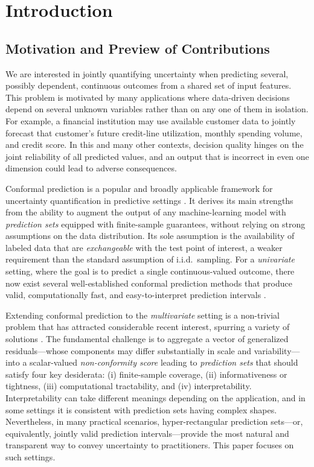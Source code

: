 \section{Introduction}
\label{sec:intro}

\subsection{Motivation and Preview of Contributions}
\label{sec:intro-motivation} 

We are interested in jointly quantifying uncertainty when predicting several, possibly dependent, continuous outcomes from a shared set of input features. 
This problem is motivated by many applications where data-driven decisions depend on several unknown variables rather than on any one of them in isolation. For example, a financial institution may use available customer data to jointly forecast that customer's future credit-line utilization, monthly spending volume, and credit score. In this and many other contexts, decision quality hinges on the joint reliability of all predicted values, and an output that is incorrect in even one dimension could lead to adverse consequences.

Conformal prediction is a popular and broadly applicable framework for uncertainty quantification in predictive settings \citep{vovk2005algorithmic, angelopoulos2023conformal}. It derives its main strengths from the ability to augment the output of any machine-learning model with {\em prediction sets} equipped with finite-sample guarantees, without relying on strong assumptions on the data distribution. Its sole assumption is the availability of labeled data that are {\em exchangeable} with the test point of interest, a weaker requirement than the standard assumption of i.i.d.~sampling. For a {\em univariate} setting, where the goal is to predict a single continuous-valued outcome, there now exist several well-established conformal prediction methods that produce valid, computationally fast, and easy-to-interpret prediction intervals \citep{lei2018distribution, romano2019conformalized, sesia2021conformal}.

Extending conformal prediction to the {\em multivariate} setting is a non-trivial problem that has attracted considerable recent interest, spurring a variety of solutions \citep{dheur2025unified}. The fundamental challenge is to aggregate a vector of generalized residuals—whose components may differ substantially in scale and variability—into a scalar-valued {\em non-conformity score} leading to {\em prediction sets} that should satisfy four key desiderata: (i) finite-sample coverage, (ii) informativeness or tightness, (iii) computational tractability, and (iv) interpretability.
Interpretability can take different meanings depending on the application, and in some settings it is consistent with prediction sets having complex shapes. Nevertheless, in many practical scenarios, hyper-rectangular prediction sets—or, equivalently, jointly valid prediction intervals—provide the most natural and transparent way to convey uncertainty to practitioners. This paper focuses on such settings.


